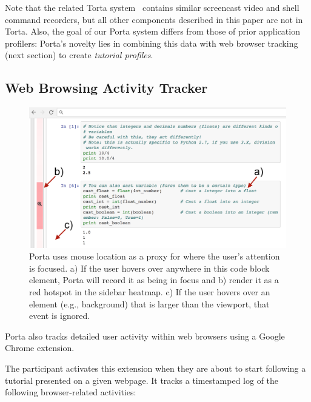 Note that the related Torta system~\cite{MysoreUIST2017} contains
similar screencast video and shell command recorders, but all other
components described in this paper are not in Torta. Also, the goal of
our Porta system differs from those of prior application profilers:
Porta's novelty lies in combining this data with web browser tracking
(next section) to create \emph{tutorial profiles}.


\subsection{Web Browsing Activity Tracker}

\begin{figure}
\includegraphics[width=\columnwidth]{figures/porta/mouse-hover.png}
\vspace{-0.5em} %
\caption{Porta uses mouse location as a proxy for where the user's
attention is focused. a) If the user hovers over anywhere in this code
block element, Porta will record it as being in focus and b) render it
as a red hotspot in the sidebar heatmap. c) If the user hovers over an
element (e.g., background) that is larger than the viewport, that event
is ignored.}
\label{fig:browser-tracking}
\vspace{-0.25em} %

\end{figure}

Porta also tracks detailed user activity within web browsers using a
Google Chrome extension.

The participant activates this extension when they are about to start
following a tutorial presented on a given webpage. It tracks a
timestamped log of the following browser-related activities:

